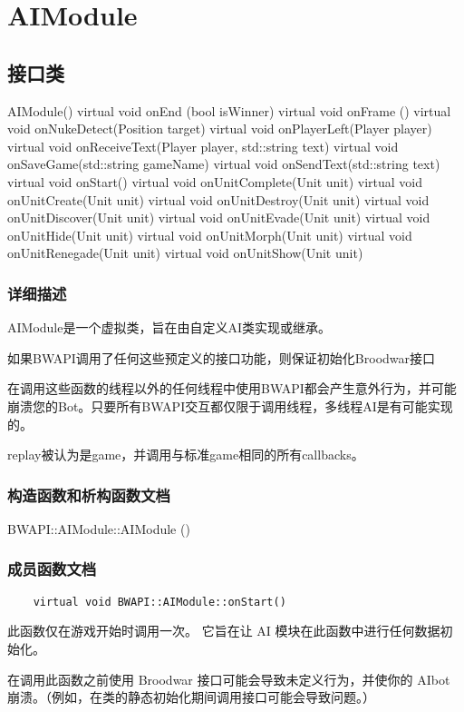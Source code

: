 \tableofcontents
\section{AIModule}
\subsection{接口类}
\begin{codebox}[公共成员函数]
AIModule()
virtual void onEnd (bool isWinner)
virtual void onFrame ()
virtual void onNukeDetect(Position target)
virtual void onPlayerLeft(Player player)
virtual void onReceiveText(Player player, std::string text)
virtual void onSaveGame(std::string gameName)
virtual void onSendText(std::string text)
virtual void onStart()
virtual void onUnitComplete(Unit unit)
virtual void onUnitCreate(Unit unit)
virtual void onUnitDestroy(Unit unit)
virtual void onUnitDiscover(Unit unit)
virtual void onUnitEvade(Unit unit)
virtual void onUnitHide(Unit unit)
virtual void onUnitMorph(Unit unit)
virtual void onUnitRenegade(Unit unit)
virtual void onUnitShow(Unit unit)
\end{codebox}

\subsubsection{详细描述}
AIModule是一个虚拟类，旨在由自定义AI类实现或继承。

如果BWAPI调用了任何这些预定义的接口功能，则保证初始化Broodwar接口

\begin{warning}
    在调用这些函数的线程以外的任何线程中使用BWAPI都会产生意外行为，并可能崩溃您的Bot。只要所有BWAPI交互都仅限于调用线程，多线程AI是有可能实现的。
    
\end{warning}

\begin{note}
    replay被认为是game，并调用与标准game相同的所有callbacks。
\end{note}
\subsubsection{构造函数和析构函数文档}
\begin{codebox}
    BWAPI::AIModule::AIModule ()
\end{codebox}
\subsubsection{成员函数文档}
\begin{tcolorbox}[colback=white, colframe=black!60!white, title=onStart(), arc=0mm]
    \begin{verbatim}
    virtual void BWAPI::AIModule::onStart()
    \end{verbatim}
    此函数仅在游戏开始时调用一次。  
    它旨在让 AI 模块在此函数中进行任何数据初始化。
    \begin{warning}
        在调用此函数之前使用 Broodwar 接口可能会导致未定义行为，并使你的 AIbot 崩溃。（例如，在类的静态初始化期间调用接口可能会导致问题。）
    \end{warning}
\end{tcolorbox}
    
